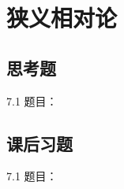\chapter{狭义相对论}

\section{思考题}

\begin{thinking}{7.1}
  题目：\todoanswer

  \begin{solution}
    \todoanswer
  \end{solution}
\end{thinking}

\section{课后习题}

\begin{exercise}{7.1}
  题目：\todoanswer

  \begin{solution}
    \todoanswer
  \end{solution}
\end{exercise}
